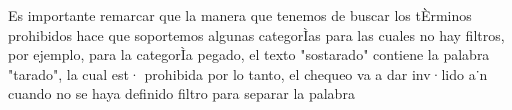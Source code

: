 Es importante remarcar que la manera que tenemos de buscar los tÈrminos prohibidos hace que soportemos algunas categorÌas para las cuales no hay filtros, por ejemplo, para la categorÌa pegado, el texto "sostarado" contiene la palabra "tarado", la cual est· prohibida por lo tanto, el chequeo va a dar inv·lido a˙n cuando no se haya definido filtro para separar la palabra